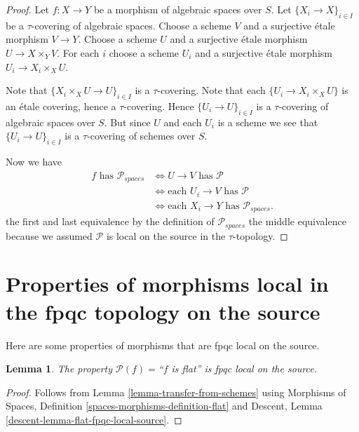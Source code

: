 \documentclass{stacks-project}
\theoremstyle{plain}
\newtheorem{lemma}[subsection]{Lemma}
\theoremstyle{definition}
\theoremstyle{remark}
\numberwithin{equation}{subsection}
\begin{document}
\begin{proof}
Let $f : X \to Y$ be a morphism of algebraic spaces over $S$.
Let $\{X_i \to X\}_{i \in I}$ be a $\tau$-covering of algebraic spaces.
Choose a scheme $V$ and a surjective \'etale morphism $V \to Y$.
Choose a scheme $U$ and a surjective \'etale morphism $U \to X \times_Y V$.
For each $i$ choose a scheme $U_i$ and a surjective \'etale morphism
$U_i \to X_i \times_X U$.

\medskip\noindent
Note that $\{X_i \times_X U \to U\}_{i \in I}$ is a $\tau$-covering.
Note that each $\{U_i \to X_i \times_X U\}$ is an \'etale covering,
hence a $\tau$-covering. Hence $\{U_i \to U\}_{i \in I}$ is a
$\tau$-covering of algebraic spaces over $S$. But since $U$ and each $U_i$
is a scheme we see that $\{U_i \to U\}_{i \in I}$ is a
$\tau$-covering of schemes over $S$.

\medskip\noindent
Now we have
\begin{align*}
f \text{ has }\mathcal{P}_{spaces}
& \Leftrightarrow
U \to V \text{ has }\mathcal{P} \\
& \Leftrightarrow
\text{each }U_i \to V \text{ has }\mathcal{P} \\
& \Leftrightarrow
\text{each }X_i \to Y\text{ has }\mathcal{P}_{spaces}.
\end{align*}
the first and last equivalence by the definition of
$\mathcal{P}_{spaces}$ the middle equivalence because we assumed
$\mathcal{P}$ is local on the source in the $\tau$-topology.
\end{proof}






\section{Properties of morphisms local in the fpqc topology on the source}
\label{section-fpqc-local-source}

\noindent
Here are some properties of morphisms that are fpqc local on the source.

\begin{lemma}
\label{lemma-flat-fpqc-local-source}
The property $\mathcal{P}(f)=$``$f$ is flat'' is fpqc local on the source.
\end{lemma}

\begin{proof}
Follows from
Lemma \ref{lemma-transfer-from-schemes}
using
Morphisms of Spaces, Definition \ref{spaces-morphisms-definition-flat}
and
Descent, Lemma \ref{descent-lemma-flat-fpqc-local-source}.
\end{proof}
\end{document}
